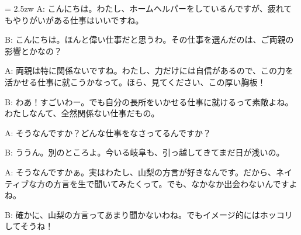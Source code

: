 \documentclass[11pt]{amsart}
\title{}
\author{}
\newenvironment{hangall}[1]{\hangindent = 2.5zw\everypar{\hangindent = 2.5zw}}{}
\begin{document}
\maketitle
\begin{hangall}{}%
A: こんにちは。わたし、ホームヘルパーをしているんですが、疲れてもやりがいがある仕事はいいですね。



B: こんにちは。ほんと偉い仕事だと思うわ。その仕事を選んだのは、ご両親の影響とかなの？



A: 両親は特に関係ないですね。わたし、力だけには自信があるので、この力を活かせる仕事に就こうかなって。ほら、見てください、この厚い胸板！



B: わあ！すごいわー。でも自分の長所をいかせる仕事に就けるって素敵よね。わたしなんて、全然関係ない仕事だもの。



A: そうなんですか？どんな仕事をなさってるんですか？



B: ううん。別のところよ。今いる岐阜も、引っ越してきてまだ日が浅いの。



A: そうなんですかぁ。実はわたし、山梨の方言が好きなんです。だから、ネイティブな方の方言を生で聞いてみたくって。でも、なかなか出会わないんですよね。



B: 確かに、山梨の方言ってあまり聞かないわね。でもイメージ的にはホッコリしてそうね！\end{hangall}
\end{document}
